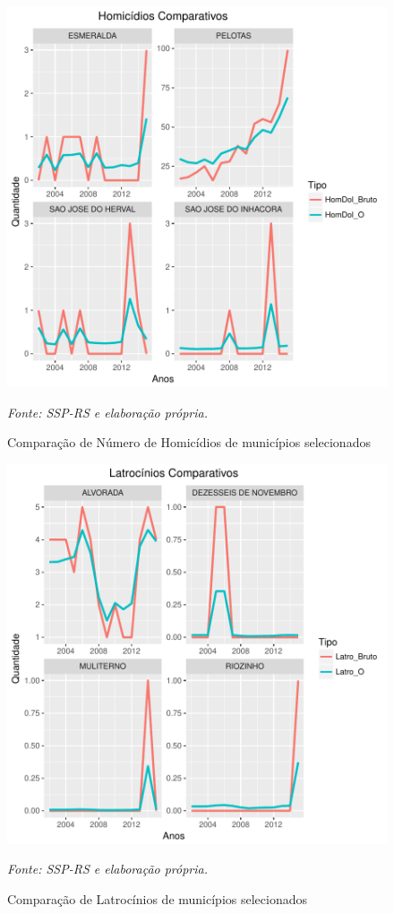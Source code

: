 \documentclass[12pt,openright,oneside,a4paper,english,french,spanish]{abntex2}
\numberwithin{table}{section} %
\numberwithin{figure}{section} %
\newcommand{\source}[1]{\textit{#1}}
\begin{document}
\begin{figure}
\begin{center}
\includegraphics{TESE_DE_DOUTORADO_RENAN_FINAL-plot8}
\end{center}
\caption{Comparação de Número de Homicídios de municípios selecionados}
\source{Fonte: SSP-RS e elaboração própria.}
\label{fig:compara_homdol_muni_selecionados}
\end{figure}

\begin{figure}
\begin{center}
\includegraphics{TESE_DE_DOUTORADO_RENAN_FINAL-plot9}
\end{center}
\caption{Comparação de Latrocínios de municípios selecionados}
\source{Fonte: SSP-RS e elaboração própria.}
\label{fig:compara_latro_muni_selecionados}
\end{figure}
\end{document}
